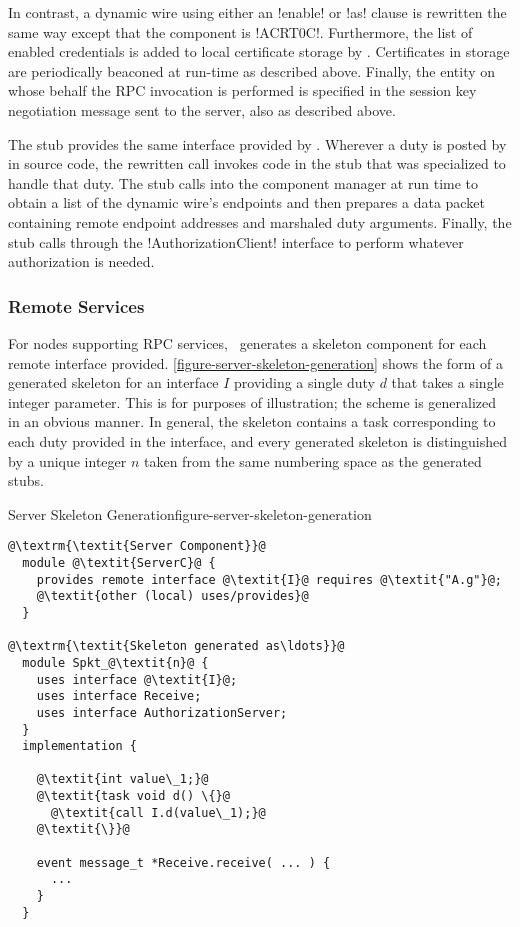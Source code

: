 In contrast, a dynamic wire using either an !enable! or !as! clause is rewritten the same way
except that the  component is !ACRT0C!. Furthermore, the list of
enabled credentials is added to local certificate storage by \Sprocket. Certificates in storage
are periodically beaconed at run-time as described above. Finally, the entity on whose behalf
the RPC invocation is performed is specified in the session key negotiation message sent to the
server, also as described above.

The  stub provides the same interface provided by
. Wherever a duty is posted by  in source code,
the rewritten call invokes code in the stub that was specialized to handle that duty. The stub
calls into the component manager at run time to obtain a list of the dynamic wire's endpoints
and then prepares a data packet containing remote endpoint addresses and marshaled duty
arguments. Finally, the stub calls through the !AuthorizationClient! interface to perform
whatever authorization is needed.

\subsubsection{Remote Services}

For nodes supporting RPC services, \Sprocket\ generates a skeleton component for each remote
interface provided. \autoref{figure-server-skeleton-generation} shows the form of a generated
skeleton for an interface $I$ providing a single duty $d$ that takes a single integer parameter.
This is for purposes of illustration; the scheme is generalized in an obvious manner. In
general, the skeleton contains a task corresponding to each duty provided in the interface, and
every generated skeleton is distinguished by a unique integer $n$ taken from the same numbering
space as the generated stubs.

\begin{fpfig}[t]{Server Skeleton Generation}{figure-server-skeleton-generation}
{
\singlespace
\begin{lstlisting}[escapechar=@]
@\textrm{\textit{Server Component}}@
  module @\textit{ServerC}@ {
    provides remote interface @\textit{I}@ requires @\textit{"A.g"}@;
    @\textit{other (local) uses/provides}@
  }

@\textrm{\textit{Skeleton generated as\ldots}}@
  module Spkt_@\textit{n}@ {
    uses interface @\textit{I}@;
    uses interface Receive;
    uses interface AuthorizationServer;
  }
  implementation {

    @\textit{int value\_1;}@
    @\textit{task void d() \{}@
      @\textit{call I.d(value\_1);}@
    @\textit{\}}@

    event message_t *Receive.receive( ... ) {
      ...
    }
  }
\end{lstlisting}
\primaryspacing
}
\end{fpfig}

